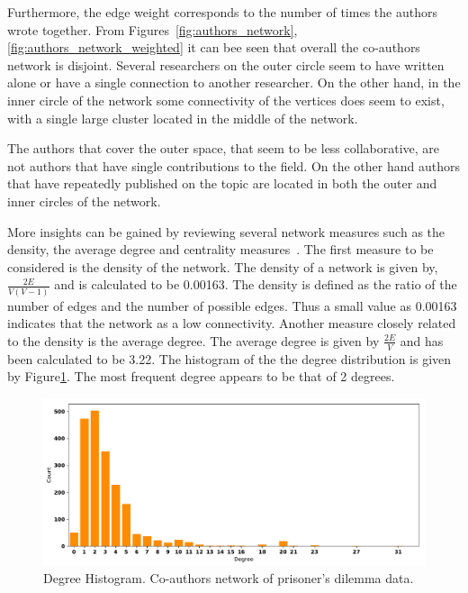 \documentclass{article}
\begin{document}
Furthermore, the edge weight corresponds to the number of times the authors
wrote together. From Figures~\ref{fig:authors_network}, \ref{fig:authors_network_weighted}
it can bee seen that overall the co-authors network is disjoint. Several researchers
on the outer circle seem to have written alone or have a single connection to
another researcher. On the other hand, in the inner circle of the network some
connectivity of the vertices does seem to exist, with a single large cluster
located in the middle of the network.
 
The authors that cover the outer space, that seem to be less collaborative,
are not authors that have single contributions to the field. On the other hand
authors that have repeatedly published on the topic are located in both the outer
and inner circles of the network.

More insights can be gained by reviewing several network measures such as the
density, the average degree and centrality measures~\cite{bakshi2009}. The first
measure to be considered is the density of the network. The density of a network
is given by, \(\frac{2E}{V(V -1)}\) and is calculated to be 0.00163. The density
is defined as the ratio of the number of edges and the number of possible edges.
Thus a small value as 0.00163 indicates that the network as a low connectivity.
Another measure closely related to the density is the average degree. The average
degree is given by \(\frac{2E}{V}\) and has been calculated to be 3.22. The
histogram of the the degree distribution is given by Figure\ref{fig:degree_hist_pd}.
The most frequent degree appears to be that of 2 degrees.

\begin{figure}
    \begin{center}
    \includegraphics[width=.8\textwidth]{./assets/images/degrees_hist_pd.pdf}
    \caption{Degree Histogram. Co-authors network of prisoner's dilemma data.}
    \label{fig:degree_hist_pd}
    \end{center}
\end{figure}
\end{document}
